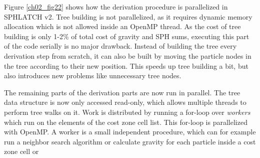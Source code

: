 Figure \ref{ch02_fig22} shows how the derivation procedure is parallelized in SPHLATCH v2. Tree building is not parallelized, as it requires dynamic memory allocation which is not allowed inside an OpenMP thread. As the cost of tree building is only 1-2\% of total cost of gravity and SPH sums, executing this part of the code serially is no major drawback. Instead of building the tree every derivation step from scratch, it can also be built by moving the particle nodes in the tree according to their new position. This speeds up tree building a bit, but also introduces new problems like unnecessary tree nodes. 

The remaining parts of the derivation parts are now run in parallel. The tree data structure is now only accessed read-only, which allows multiple threads to perform tree walks on it. Work is distributed by running a for-loop over \emph{workers} which run on the elements of the cost zone cell list. This for-loop is parallelized with OpenMP. A worker is a small independent procedure, which can for example run a neighbor search algorithm or calculate gravity for each particle inside a cost zone cell or 

